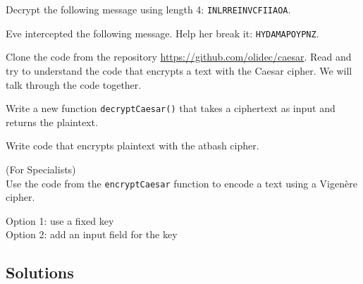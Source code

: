 \documentclass[11pt,a4paper]{report}
\begin{document}
\begin{ex}
Decrypt the following message using length 4: \verb|INLRREINVCFIIAOA|.
\end{ex}

\begin{ex}
Eve intercepted the following message. Help her break it: \verb|HYDAMAPOYPNZ|.
\end{ex}







\begin{ex}
Clone the code from the repository \url{https://github.com/olidec/caesar}. Read and try to understand the code that encrypts a text with the Caesar cipher. We will talk through the code together.
\end{ex}

\begin{ex}
Write a new function \verb|decryptCaesar()| that takes a ciphertext as input and returns the plaintext.
\end{ex}

\begin{ex}
Write code that encrypts plaintext with the atbash cipher. 
\end{ex}

\begin{ex}
(For Specialists) \\
Use the code from the \verb|encryptCaesar| function to encode a text using a Vigenère cipher. 

Option 1: use a fixed key \\
Option 2: add an input field for the key
\end{ex}

\newpage

\subsection*{Solutions}
\printcursols
\end{document}
